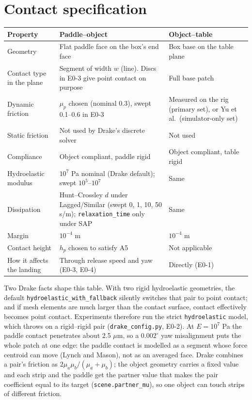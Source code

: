 \documentclass[10pt]{article}
\newcommand{\code}[1]{\texttt{#1}}
\begin{document}
\section{Contact specification}
\label{sec:contact}
\begin{center}\small
\begin{tabular}{@{}p{3.1cm}p{6.2cm}p{6.2cm}@{}}
\toprule
Property & Paddle--object & Object--table\\
\midrule
Geometry & Flat paddle face on the box's end face & Box base on the table plane\\
Contact type in the plane & Segment of width $w$ (line).  Discs in E0-3 give point contact on purpose & Full base patch\\
Dynamic friction & $\mu_p$ chosen (nominal 0.3), swept 0.1--0.6 in E0-3 & Measured on the rig (primary set), or Yu et al.\ (simulator-only set)\\
Static friction & Not used by Drake's discrete solver & Not used\\
Compliance & Object compliant, paddle rigid & Object compliant, table rigid\\
Hydroelastic modulus & $10^{7}$ Pa nominal (Drake default); swept $10^{5}$--$10^{7}$ & Same\\
Dissipation & Hunt--Crossley $d$ under Lagged/Similar (swept 0, 1, 10, 50 s/m); \code{relaxation\_time} only under SAP & Same\\
Margin & $10^{-4}$ m & $10^{-4}$ m\\
Contact height & $h_p$ chosen to satisfy A5 & Not applicable\\
How it affects the landing & Through release speed and yaw (E0-3, E0-4) & Directly (E0-1)\\
\bottomrule
\end{tabular}
\end{center}
Two Drake facts shape this table.  With two rigid hydroelastic geometries, the default
\code{hydroelastic\_with\_fallback} silently switches that pair to point contact; and if mesh elements are much
larger than the contact surface, contact effectively becomes point contact.  Experiments therefore run the strict
\code{hydroelastic} model, which throws on a rigid--rigid pair (\code{drake\_config.py}, E0-2).  At
$E=10^{7}$ Pa the paddle contact penetrates about 2.5 $\mu$m, so a $0.002^\circ$ yaw misalignment puts the whole
patch at one edge: the paddle contact is modelled as a segment whose force centroid can move (Lynch and Mason), not
as an averaged face.  Drake combines a pair's friction as $2\mu_a\mu_b/(\mu_a+\mu_b)$; the object geometry carries a
fixed value and each strip and the paddle get the partner value that makes the pair coefficient equal to its target
(\code{scene.partner\_mu}), so one object can touch strips of different friction.
\end{document}
